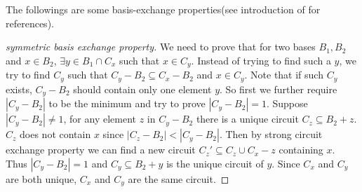 \documentclass[12pt]{article}
\begin{document}
The followings are some basis-exchange properties(see introduction of \cite{Bonin_Savitsky_2016} for references).

\begin{proof}[symmetric basis exchange property]\label{prf:sym_base_exchange}
We need to prove that for two bases $B_1,B_2$ and $x\in B_2$, $\exists y\in B_1\cap C_x$ such that $x\in C_y$. Instead of trying to find such a $y$, we try to find $C_y$ such that $C_y-B_2\subseteq C_x-B_2$ and $x\in C_y$. Note that if such $C_y$ exists, $C_y -B_2$ should contain only one element $y$. So first we further require $|C_y-B_2|$ to be the minimum and try to prove $|C_y-B_2|=1$. Suppose $|C_y-B_2|\not =1$, for any element $z$ in $C_y-B_2$ there is a unique circuit $C_z\subseteq B_2+z$. $C_z$ does not contain $x$ since $|C_z-B_2|<|C_y-B_2|$. Then by strong circuit exchange property we can find a new circuit $C_z'\subseteq C_z\cup C_x-z$ containing $x$. Thus $|C_y-B_2|=1$ and $C_y\subseteq B_2+y$ is the unique circuit of $y$. Since $C_x$ and $C_y$ are both unique, $C_x$ and $C_y$ are the same circuit.
\end{proof}
\end{document}
